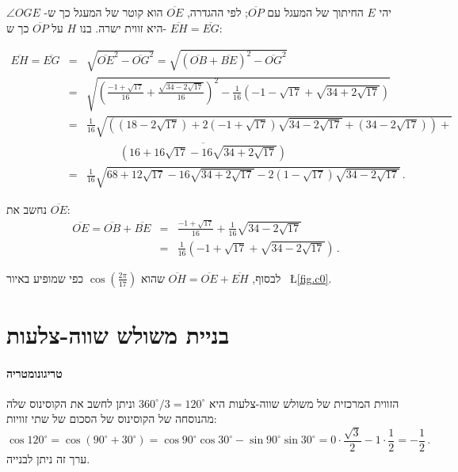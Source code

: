 \documentclass[11pt,a4paper]{article}
\newenvironment{form}[1]{%
\begin{displaymath}%
\renewcommand{\arraystretch}{#1}%
\begin{array}{lcl}}%
{\end{array}%
\end{displaymath}%
}
\newcommand*{\disfrac}[2]{\displaystyle\frac{#1}{#2}}
\begin{document}
יהי
$E$
החיתוך של המעגל עם
$\overline{OP}$;
לפי ההגדרה,
$\overline{OE}$
הוא קוטר של המעגל כך ש-%
$\angle OGE$
היא זווית ישרה.
בנו
$H$
על
$\overline{OP}$
כך ש-%
$\overline{EH}=\overline{EG}$:

\begin{form}{2}
\overline{EH}=\overline{EG}&=&\sqrt{\overline{OE}^2-\overline{OG}^2}=\sqrt{(\overline{OB}+\overline{BE})^2-\overline{OG}^2}\\
&=&\sqrt{\left(\disfrac{-1+\sqrt{17}}{16}+\disfrac{\sqrt{34-2\sqrt{17}}}{16}\right)^2-
\disfrac{1}{16}\left(-1-\sqrt{17}+\sqrt{34+2\sqrt{17}}\right)}
\\
&=&\disfrac{1}{16}\sqrt{\left(
(18-2\sqrt{17})+ 2(-1+\sqrt{17})\sqrt{34-2\sqrt{17}}+
(34-2\sqrt{17})\right)+}\\
&&\quad\quad\quad\overline{
\left(16+16\sqrt{17}-16\sqrt{34+2\sqrt{17}}\right)}\\
&=&\disfrac{1}{16}\sqrt{
68+12\sqrt{17}-16\sqrt{34+2\sqrt{17}}-2(1-\sqrt{17})\sqrt{34-2\sqrt{17}}
}\,.
\end{form}

נחשב את
$\overline{OE}$:
\begin{form}{2}
\overline{OE}=\overline{OB}+\overline{BE}&=&\disfrac{-1+\sqrt{17}}{16}+\disfrac{1}{16}\sqrt{34-2\sqrt{17}}\\
&=&\disfrac{1}{16}\left(-1+\sqrt{17}+\sqrt{34-2\sqrt{17}}\right)\,.
\end{form}

לבסוף,
$\overline{OH}=\overline{OE}+\overline{EH}$
שהוא
$\cos \left(\disfrac{2\pi}{17}\right)$
כפי שמופיע באיור~%
\L{\ref{fig.c0}}.

\newpage

\appendix
\section{בניית משולש שווה-צלעות}\label{a.triangle}


\paragraph{טריגונומטריה}
הזווית המרכזית של משולש שווה-צלעות היא
$360^\circ/3=120^\circ$ 
וניתן לחשב את הקוסינוס שלה מהנוסחה של הקוסינוס של הסכום של שתי זוויות:
\[
\cos 120^\circ = \cos(90^\circ+30^\circ)=\cos 90^\circ \cos 30^\circ  -\sin 90^\circ \sin 30^\circ = 0\cdot \frac{\sqrt{3}}{2} - 1\cdot \frac{1}{2}=-\disfrac{1}{2}\,.
\]
ערך זה ניתן לבנייה.
\end{document}
